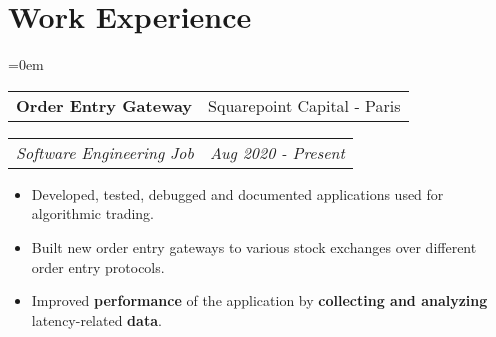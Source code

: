 \documentclass{article}
\makeatletter
\newcommand{\headerrow}[2]
{\begin{tabular*}{\linewidth}{l@{\extracolsep{\fill}}r}
    #1 &
    #2 \\
\end{tabular*}}
\makeatother
\begin{document}
\section*{Work Experience}
\begin{list} {}{\leftmargin=0em}
\setlength{\leftmargin}{0pt}
\item[]
    \headerrow {\textbf{Order Entry Gateway}}{Squarepoint Capital - Paris}
    \headerrow {\emph{Software Engineering Job}}{\emph{Aug 2020 - Present}}

    \begin{itemize}[noitemsep,nolistsep]
        \item
            Developed, tested, debugged and documented applications used for
            algorithmic trading.
        \item
            Built new order entry gateways to various stock exchanges over different order entry protocols.
        \item
            Improved \textbf{performance} of the application by
            \textbf{collecting and analyzing} latency-related \textbf{data}.
    \end{itemize}

\end{list}
\end{document}
